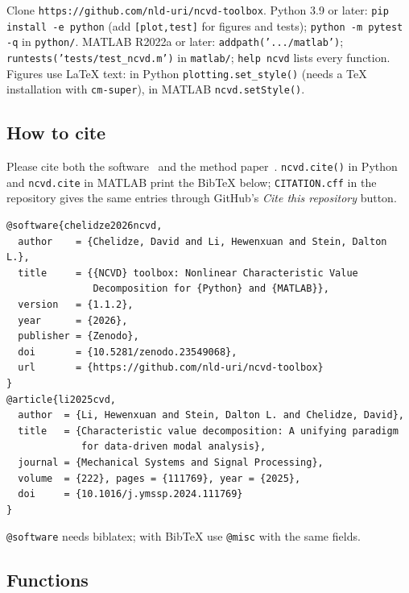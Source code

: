 \documentclass[report]{nld}
\theoremstyle{remark}\newtheorem*{remark}{Remark}
\newcommand{\code}[1]{\texttt{#1}}
\begin{document}
Clone \code{https://github.com/nld-uri/ncvd-toolbox}. Python 3.9 or later: \code{pip install -e python} (add \code{[plot,test]} for
figures and tests); \code{python -m pytest -q} in \code{python/}. MATLAB
R2022a or later: \code{addpath('.../matlab')};
\code{runtests('tests/test\_ncvd.m')} in \code{matlab/}; \code{help ncvd} lists
every function. Figures use LaTeX text: in Python \code{plotting.set\_style()}
(needs a TeX installation with \code{cm-super}), in MATLAB \code{ncvd.setStyle()}.

\subsection{How to cite}\label{sec:cite}

Please cite both the software~\cite{ncvd2026} and the method
paper~\cite{li2025}. \code{ncvd.cite()} in Python and \code{ncvd.cite} in
MATLAB print the BibTeX below; \code{CITATION.cff} in the repository gives the
same entries through GitHub's \emph{Cite this repository} button.

\begin{lstlisting}[language={}]
@software{chelidze2026ncvd,
  author    = {Chelidze, David and Li, Hewenxuan and Stein, Dalton L.},
  title     = {{NCVD} toolbox: Nonlinear Characteristic Value
               Decomposition for {Python} and {MATLAB}},
  version   = {1.1.2},
  year      = {2026},
  publisher = {Zenodo},
  doi       = {10.5281/zenodo.23549068},
  url       = {https://github.com/nld-uri/ncvd-toolbox}
}
@article{li2025cvd,
  author  = {Li, Hewenxuan and Stein, Dalton L. and Chelidze, David},
  title   = {Characteristic value decomposition: A unifying paradigm
             for data-driven modal analysis},
  journal = {Mechanical Systems and Signal Processing},
  volume  = {222}, pages = {111769}, year = {2025},
  doi     = {10.1016/j.ymssp.2024.111769}
}
\end{lstlisting}

\noindent\code{@software} needs biblatex; with BibTeX use \code{@misc} with the
same fields.

\subsection{Functions}
\end{document}
